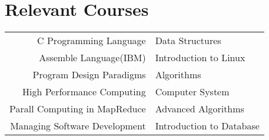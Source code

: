 \documentclass[10pt]{article} %
\begin{document}
{\begin{minipage}[t]{0.44\textwidth}
\begin{tabular}{rl}

	 

	

\end{tabular}\\[10pt]


\section{Relevant Courses} 

\begin{tabular}{rl}
C Programming Language  & Data Structures\\
Assemble Language(IBM)  & Introduction to Linux\\ [6pt]


Program Design Paradigms	  & Algorithms\\
High Performance Computing    & Computer System\\
Parall Computing in MapReduce & Advanced Algorithms\\
Managing Software Development & Introduction to Database
\end{tabular}\\[10pt]



\end{minipage}}
\end{document}
